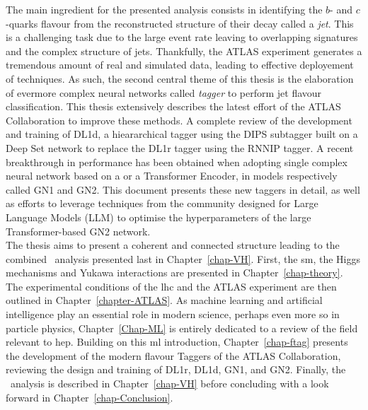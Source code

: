 The main ingredient for the presented analysis consists in identifying the $b$- and $c$-quarks flavour from the reconstructed structure of their decay called a \textit{jet}. This is a challenging task due to the large event rate leaving to overlapping signatures and the complex structure of jets. Thankfully, the ATLAS experiment generates a tremendous amount of real and simulated data, leading to effective deployement of  techniques. As such, the second central theme of this thesis is the elaboration of evermore complex neural networks called \textit{tagger} to perform jet flavour classification. This thesis extensively describes the latest effort of the ATLAS Collaboration to improve these methods. A complete review of the development and training of DL1d, a hieararchical tagger using the DIPS subtagger built on a Deep Set network to replace the DL1r tagger using the RNNIP tagger. A recent breakthrough in performance has been obtained when adopting single complex neural network based on a  or a Transformer Encoder, in models respectively called GN1 and GN2. This document presents these new taggers in detail, as well as efforts to leverage techniques from the  community designed for Large Language Models (LLM) to optimise the hyperparameters of the large Transformer-based GN2 network. \\

The thesis aims to present a coherent and connected structure leading to the combined \vhbc\ analysis presented last in Chapter~\ref{chap-VH}. First, the \gls{sm}, the Higgs mechanisms and Yukawa interactions are presented in Chapter~\ref{chap-theory}. The experimental conditions of the \gls{lhc} and the ATLAS experiment are then outlined in Chapter~\ref{chapter-ATLAS}. As machine learning and artificial intelligence play an essential role in modern science, perhaps even more so in particle physics, Chapter~\ref{Chap-ML} is entirely dedicated to a review of the field relevant to \gls{hep}. Building on this \gls{ml} introduction, Chapter~\ref{chap-ftag} presents the development of the modern flavour Taggers of the ATLAS Collaboration, reviewing the design and training of DL1r, DL1d, GN1, and GN2. Finally, the \vhbc\ analysis is described in Chapter~\ref{chap-VH} before concluding with a look forward in Chapter~\ref{chap-Conclusion}.